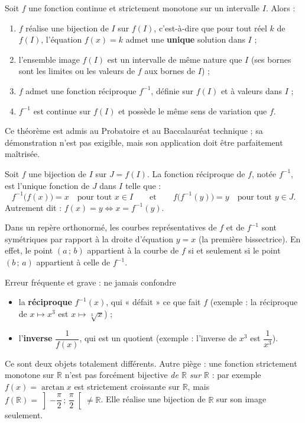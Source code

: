 \documentclass[11pt]{article}
\newcommand{\cle}[1]{{\popxbold\color{popdark}#1}}
\begin{document}
\begin{propriete}
Soit $f$ une fonction \cle{continue} et \cle{strictement monotone} sur un intervalle $I$. Alors :
\begin{enumerate}
\item $f$ réalise une \cle{bijection} de $I$ sur $f(I)$, c'est-à-dire que pour tout réel $k$ de $f(I)$, l'équation $f(x) = k$ admet une \textbf{unique} solution dans $I$ ;
\item l'ensemble image $f(I)$ est un intervalle de même nature que $I$ (ses bornes sont les limites ou les valeurs de $f$ aux bornes de $I$) ;
\item $f$ admet une \cle{fonction réciproque} $f^{-1}$, définie sur $f(I)$ et à valeurs dans $I$ ;
\item $f^{-1}$ est \cle{continue} sur $f(I)$ et possède le \cle{même sens de variation} que $f$.
\end{enumerate}
Ce théorème est admis au Probatoire et au Baccalauréat technique ; sa démonstration n'est pas exigible, mais son application doit être parfaitement maîtrisée.
\end{propriete}

\begin{definition}
Soit $f$ une bijection de $I$ sur $J = f(I)$. La \cle{fonction réciproque} de $f$, notée $f^{-1}$, est l'unique fonction de $J$ dans $I$ telle que :
\[ f^{-1}\bigl(f(x)\bigr) = x \quad \text{pour tout } x \in I \qquad \text{et} \qquad f\bigl(f^{-1}(y)\bigr) = y \quad \text{pour tout } y \in J. \]
Autrement dit : $f(x) = y \iff x = f^{-1}(y)$.
\end{definition}

\begin{aretenir}
Dans un repère orthonormé, les courbes représentatives de $f$ et de $f^{-1}$ sont \cle{symétriques par rapport à la droite d'équation $y = x$} (la première bissectrice). En effet, le point $(a\,;\,b)$ appartient à la courbe de $f$ si et seulement si le point $(b\,;\,a)$ appartient à celle de $f^{-1}$.
\end{aretenir}

\begin{attention}
Erreur fréquente et grave : ne jamais confondre
\begin{itemize}
\item la \textbf{réciproque} $f^{-1}(x)$, qui « défait » ce que fait $f$ (exemple : la réciproque de $x \mapsto x^3$ est $x \mapsto \sqrt[3]{x}$) ;
\item l'\textbf{inverse} $\dfrac{1}{f(x)}$, qui est un quotient (exemple : l'inverse de $x^3$ est $\dfrac{1}{x^3}$).
\end{itemize}
Ce sont deux objets totalement différents. Autre piège : une fonction strictement monotone sur $\mathbb{R}$ n'est pas forcément bijective \emph{de $\mathbb{R}$ sur $\mathbb{R}$} : par exemple $f(x)=\arctan x$ est strictement croissante sur $\mathbb{R}$, mais $f(\mathbb{R}) = \left]-\dfrac{\pi}{2}\,;\,\dfrac{\pi}{2}\right[ \neq \mathbb{R}$. Elle réalise une bijection de $\mathbb{R}$ sur son image seulement.
\end{attention}
\end{document}
